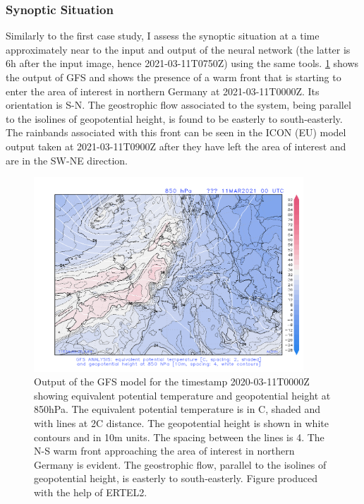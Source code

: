 \subsubsection{Synoptic Situation}
Similarly to the first case study, I assess the synoptic situation at a time approximately near to the input and output of the neural network (the latter is 6h after the input image, hence 2021-03-11T0750Z) using the same tools. \cref{fig:ertel2} shows the output of GFS and shows the presence of a warm front that is starting to enter the area of interest in northern Germany at 2021-03-11T0000Z. Its orientation is S-N. The geostrophic flow associated to the system, being parallel to the isolines of geopotential height, is found to be easterly to south-easterly. The rainbands associated with this front can be seen in the ICON (EU) model output taken at 2021-03-11T0900Z after they have left the area of interest and are in the SW-NE direction.
\begin{figure}[!h]
    \centering
    \includegraphics[width=0.9\textwidth]{2103110000_gfs.png}
    \caption{Output of the GFS model for the timestamp 2020-03-11T0000Z showing equivalent potential temperature and geopotential height at 850hPa. The equivalent potential temperature is in C, shaded and with lines at 2\textdegree C distance. The geopotential height is shown in white contours and in 10m units. The spacing between the lines is 4. The N-S warm front approaching the area of interest in northern Germany is evident. The geostrophic flow, parallel to the isolines of geopotential height, is easterly to south-easterly. Figure produced with the help of ERTEL2.}
    \label{fig:ertel2}
\end{figure}

